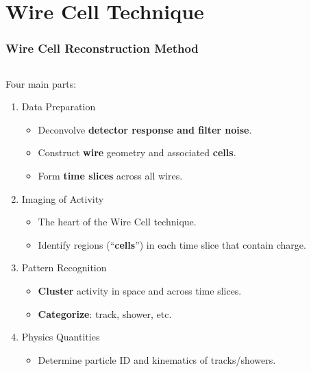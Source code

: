 \section{Wire Cell Technique}

\begin{frame}
\end{frame}


\begin{frame}[fragile]
  \frametitle{Wire Cell Reconstruction Method}
  \begin{columns}
    \begin{column}{0.7\textwidth}
      Four main parts:
      \begin{enumerate}
      \item<2> Data Preparation
        \begin{itemize}        \scriptsize
        \item Deconvolve \textbf{detector response and filter noise}.
        \item Construct \textbf{wire} geometry and associated \textbf{cells}.
        \item Form \textbf{time slices} across all wires.
        \end{itemize}
      \item<3> Imaging of Activity
        \begin{itemize}        \scriptsize
        \item The heart of the Wire Cell technique.
        \item Identify regions (``\textbf{cells}'') in each time slice that contain charge.
        \end{itemize}
      \item<4> Pattern Recognition 
        \begin{itemize}         \scriptsize
        \item \textbf{Cluster} activity in space and across time slices.
        \item \textbf{Categorize}: track, shower, etc.
        \end{itemize}
      \item<5> Physics Quantities
        \begin{itemize}         \scriptsize
        \item Determine particle ID and kinematics of tracks/showers.
        \end{itemize}
      \end{enumerate}
    \end{column}
    \begin{column}{0.3\textwidth}
      \begin{center}
        \vspace{-10mm}
        \resizebox{!}{\textheight}{}
      \end{center}
    \end{column}
  \end{columns}

\end{frame}

